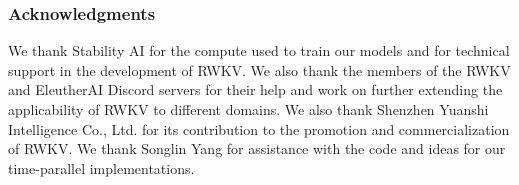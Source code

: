 \subsubsection*{Acknowledgments}
We thank Stability AI for the compute used to train our models and for technical support in the development of RWKV. We also thank the members of the RWKV and EleutherAI Discord servers for their help and work on further extending the applicability of RWKV to different domains. We also thank Shenzhen Yuanshi Intelligence Co., Ltd. for its contribution to the promotion and commercialization of RWKV. We thank Songlin Yang for assistance with the code and ideas for our time-parallel implementations.


